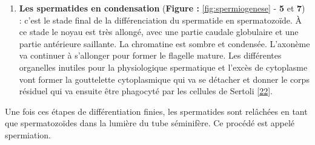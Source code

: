 \documentclass[12pt,twoside]{reedthesis}
\providecommand{\tightlist}{%
  \setlength{\itemsep}{0pt}\setlength{\parskip}{0pt}}
\theoremstyle{definition}
\theoremstyle{definition}
\theoremstyle{remark}
\begin{document}
  \newpage
  
  \begin{enumerate}
  \def\labelenumi{\arabic{enumi}.}
  \setcounter{enumi}{2}
  \tightlist
  \item
    \textbf{Les spermatides en condensation} (\textbf{Figure :
    }\ref{fig:spermiogenese} - \textbf{5} et \textbf{7}) : c'est le stade
    final de la différenciation du spermatide en spermatozoïde. À ce stade
    le noyau est très allongé, avec une partie caudale globulaire et une
    partie antérieure saillante. La chromatine est sombre et condensée.
    L'axonème va continuer à s'allonger pour former le flagelle mature.
    Les différentes organelles inutiles pour la physiologique spermatique
    et l'excès de cytoplasme vont former la gouttelette cytoplasmique qui
    va se détacher et donner le corps résiduel qui va ensuite être
    phagocyté par les cellules de Sertoli
    {[}\protect\hyperlink{ref-Hermo2010}{22}{]}.
  \end{enumerate}
  
  Une fois ces étapes de différentiation finies, les spermatides sont
  relâchées en tant que spermatozoïdes dans la lumière du tube séminifère.
  Ce procédé est appelé spermiation.
  
\end{document}
